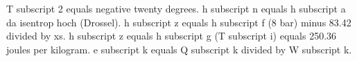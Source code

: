 T subscript 2 equals negative twenty degrees. h subscript n equals h subscript a da isentrop hoch (Drossel). h subscript z equals h subscript f (8 bar) minus 83.42 divided by xs. h subscript z equals h subscript g (T subscript i) equals 250.36 joules per kilogram. e subscript k equals Q subscript k divided by W subscript k.
